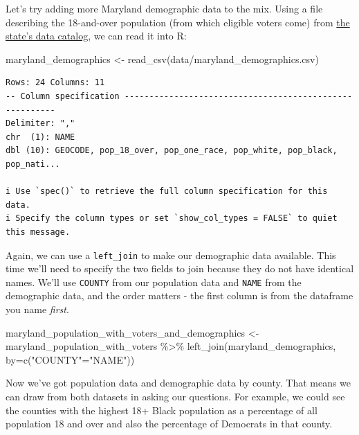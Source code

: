 \documentclass[
  letterpaper,
  DIV=11,
  numbers=noendperiod]{scrreprt}
\newenvironment{Shaded}{\begin{snugshade}}{\end{snugshade}}
\newcommand{\AttributeTok}[1]{\textcolor[rgb]{0.40,0.45,0.13}{#1}}
\newcommand{\FunctionTok}[1]{\textcolor[rgb]{0.28,0.35,0.67}{#1}}
\newcommand{\NormalTok}[1]{\textcolor[rgb]{0.00,0.23,0.31}{#1}}
\newcommand{\OtherTok}[1]{\textcolor[rgb]{0.00,0.23,0.31}{#1}}
\newcommand{\SpecialCharTok}[1]{\textcolor[rgb]{0.37,0.37,0.37}{#1}}
\newcommand{\StringTok}[1]{\textcolor[rgb]{0.13,0.47,0.30}{#1}}
\begin{document}
Let's try adding more Maryland demographic data to the mix. Using a file
describing the 18-and-over population (from which eligible voters come)
from
\href{https://planning.maryland.gov/MSDC/Pages/census/Census2020/pL_2020redistricting.aspx}{the
state's data catalog}, we can read it into R:

\begin{Shaded}
\begin{Highlighting}[]
\NormalTok{maryland\_demographics }\OtherTok{\textless{}{-}} \FunctionTok{read\_csv}\NormalTok{(}\StringTok{\textquotesingle{}data/maryland\_demographics.csv\textquotesingle{}}\NormalTok{)}
\end{Highlighting}
\end{Shaded}

\begin{verbatim}
Rows: 24 Columns: 11
-- Column specification --------------------------------------------------------
Delimiter: ","
chr  (1): NAME
dbl (10): GEOCODE, pop_18_over, pop_one_race, pop_white, pop_black, pop_nati...

i Use `spec()` to retrieve the full column specification for this data.
i Specify the column types or set `show_col_types = FALSE` to quiet this message.
\end{verbatim}

Again, we can use a \texttt{left\_join} to make our demographic data
available. This time we'll need to specify the two fields to join
because they do not have identical names. We'll use \texttt{COUNTY} from
our population data and \texttt{NAME} from the demographic data, and the
order matters - the first column is from the dataframe you name
\emph{first}.

\begin{Shaded}
\begin{Highlighting}[]
\NormalTok{maryland\_population\_with\_voters\_and\_demographics }\OtherTok{\textless{}{-}}\NormalTok{ maryland\_population\_with\_voters }\SpecialCharTok{\%\textgreater{}\%} \FunctionTok{left\_join}\NormalTok{(maryland\_demographics, }\AttributeTok{by=}\FunctionTok{c}\NormalTok{(}\StringTok{"COUNTY"}\OtherTok{=}\StringTok{"NAME"}\NormalTok{))}
\end{Highlighting}
\end{Shaded}

Now we've got population data and demographic data by county. That means
we can draw from both datasets in asking our questions. For example, we
could see the counties with the highest 18+ Black population as a
percentage of all population 18 and over and also the percentage of
Democrats in that county.
\end{document}
